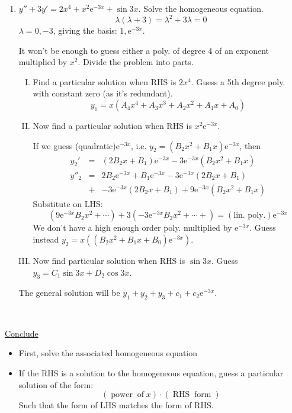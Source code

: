 \documentclass{article}
\newcommand{\mathe}{\mathrm{e}}
\newcommand{\tmop}[1]{\ensuremath{\operatorname{#1}}}
\newcommand{\tmsession}[3]{{\tt#3}}
\newenvironment{enumerateromancap}{\begin{enumerate}[I.] }{\end{enumerate}}
\begin{document}
\begin{enumerate}
  \item $y'' + 3 y' = 2 x^4 + x^2 \mathe^{- 3 x} + \sin 3 x$. Solve the
  homogeneous equation.
  \[ \lambda (\lambda + 3) = \lambda^2 + 3 \lambda = 0 \]
  $\lambda = 0, - 3$, giving the basis: $1, \mathe^{- 3 x}$.
  
  It won't be enough to guess either a poly. of degree 4 of an exponent
  multiplied by $x^2$. Divide the problem into parts.
  \begin{enumerateromancap}
    \item Find a particular solution when RHS is $2 x^4$. Guess a 5th degree
    poly. with constant zero (as it's redundant).
    \[ y_1 = x (A_4 x^4 + A_3 x^3 + A_2 x^2 + A_1 x + A_0) \]
    \item Now find a particular solution when RHS is $x^2 \mathe^{- 3 x}$.
    
    If we guess (quadratic)$\mathe^{- 3 x}$, i.e. $y_2 = (B_2 x^2 + B_1 x)
    \mathe^{- 3 x}$, then
    \begin{eqnarray*}
      y_2' & = & (2 B_2 x + B_1) \mathe^{- 3 x} - 3 \mathe^{- 3 x} (B_2 x^2 +
      B_1 x)\\
      y''_2 & = & 2 B_2 \mathe^{- 3 x} + B_1 \mathe^{- 3 x} - 3 \mathe^{- 3 x}
      (2 B_2 x + B_1)\\
      & + & - 3 \mathe^{- 3 x} (2 B_2 x + B_1) + 9 \mathe^{- 3 x} (B_2 x^2 +
      B_1 x)
    \end{eqnarray*}
    Substitute on LHS:
    \[ (9 \mathe^{- 3 x} B_2 x^2 + \cdots) + 3 (- 3 \mathe^{- 3 x} B_2 x^2 +
       \cdots +) = \left( \text{lin. poly.} \right) \mathe^{- 3 x} \]
    We don't have a high enough order poly. multiplied by $\mathe^{- 3 x}$.
    Guess instead {$y_2 = x ((B_2 x^2 + B_1 x + B_0) \mathe^{- 3 x})$}.
    
    \item Now find particular solution when RHS is $\sin 3 x$. Guess ${y_3 =
    C_1 \sin 3 x + D_2 \cos 3 x} {}$.
  \end{enumerateromancap}
  The general solution will be $y_1 + y_2 + y_3 + c_1 + c_2 \mathe^{- 3 x}$.
  
  
  
  \ 
\end{enumerate}
\begin{tmornamented}
  {\underline{Conclude}}
  \begin{itemize}
    \item First, solve the associated homogeneous equation
    
    \item If the RHS is a solution to the homogeneous equation, guess a
    particular solution of the form:
    \[ (\tmop{power} \tmop{of} x) \cdot (\tmop{RHS} \tmop{form}) \]
    Such that the form of LHS matches the form of RHS.
  \end{itemize}
  \tmsession{matlab}{default}{}
\end{tmornamented}
\end{document}
